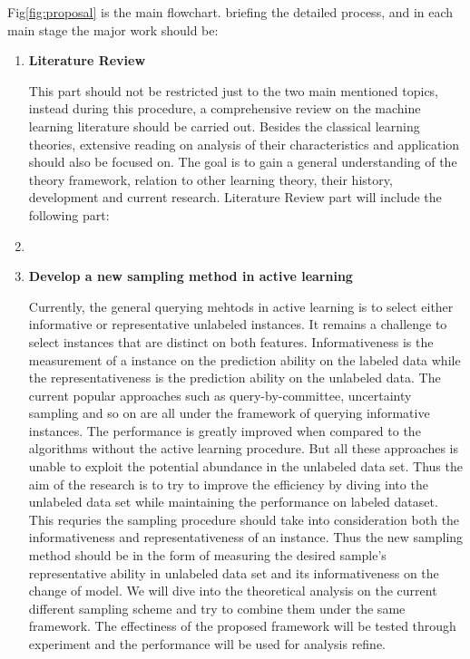 Fig\ref{fig:proposal} is the main flowchart.  briefing the detailed process, and in each main stage the major work should be:
\begin{enumerate}
 \item \textbf{Literature Review}
 
 This part should not be restricted just to the two main mentioned topics, instead during this procedure, a comprehensive review on the machine learning literature should be carried out. Besides the classical learning theories, extensive reading on analysis of their characteristics and application should also be focused on. The goal is to gain a general understanding of the theory framework, relation to other learning theory,  their history, development and current research. 
 Literature Review part will include the following part:
 \item \textbf{}
 
 \item \textbf{Develop a new sampling method in active learning}
 
 Currently, the general querying mehtods in active learning is to select either informative or representative unlabeled instances\cite{huang2010active}. It remains a challenge to select instances that are distinct on both features\cite{huang2010active}. Informativeness is the measurement of a instance on the prediction ability on the labeled data while the representativeness is the prediction ability on the unlabeled data. The current popular approaches such as query-by-committee\cite{Settles2010}, uncertainty sampling\cite{Settles2010} and so on are all under the framework of querying informative instances. The performance is greatly improved when compared to the algorithms without the active learning procedure. But all these approaches is unable to exploit the potential abundance in the unlabeled data set. Thus the aim of the research is to try to improve the efficiency by diving into the unlabeled data set while maintaining the performance on labeled dataset. This requries the sampling procedure should take into consideration both the informativeness and representativeness of an instance. Thus the new sampling method should be in the form of measuring the desired sample's representative ability in unlabeled data set and its informativeness on the change of model. We will dive into the theoretical analysis on the current different sampling scheme and try to combine them under the same framework. The effectiness of the proposed framework will be tested through experiment and the performance will be used for analysis refine.
 

\end{enumerate}
